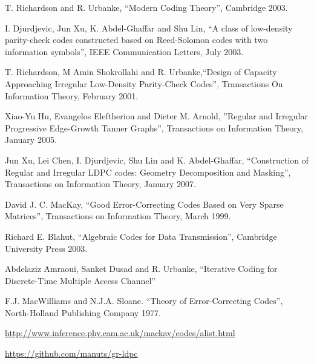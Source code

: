 \begin{thebibliography}{9}

 T. Richardson and R. Urbanke, ``Modern Coding Theory'', Cambridge 2003.

 I. Djurdjevic,  Jun Xu, K. Abdel-Ghaffar and Shu Lin, 
``A class of low-density parity-check codes constructed based on Reed-Solomon codes with two information symbols'',
IEEE Communication Letters, July 2003.

 T. Richardson, M Amin Shokrollahi and R. Urbanke,``Design of Capacity Approaching Irregular 
Low-Density Parity-Check Codes'', Transactions On Information Theory, February 2001.

 Xiao-Yu Hu, Evangelos Eleftheriou and Dieter M. Arnold, ''Regular and Irregular Progressive Edge-Growth
Tanner Graphs'', Transactions on Information Theory, January 2005.

 Jun Xu, Lei Chen, I. Djurdjevic, Shu Lin and K. Abdel-Ghaffar, ``Construction of Regular and Irregular
LDPC codes: Geometry Decomposition and Masking'', Transactions on Information Theory, January 2007.

 David J. C. MacKay, ``Good Error-Correcting Codes Based on Very Sparse Matrices'', Transactions on Information
Theory, March 1999.

 Richard E. Blahut, ``Algebraic Codes for Data Transmission'', Cambridge University Press 2003.

 Abdelaziz Amraoui, Sanket Dusad and R. Urbanke, ``Iterative Coding for Discrete-Time Multiple Access Channel''

 F.J. MacWilliams and N.J.A. Sloane. ``Theory of Error-Correcting Codes'', North-Holland Publishing Company 1977. 

 \url{http://www.inference.phy.cam.ac.uk/mackay/codes/alist.html}

 \url{https://github.com/manuts/gr-ldpc}
\end{thebibliography}